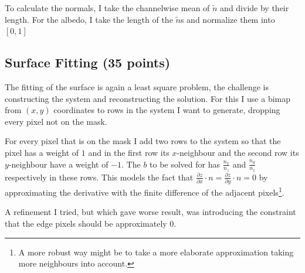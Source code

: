 \documentclass{paper}
\begin{document}
To calculate the normals, I take the channelwise mean of $\tilde{n}$ and divide by their length. For the albedo, I take the length of the $\tilde{n}$s and normalize them into $[0,1]$

\subsection{Surface Fitting (35 points)}

The fitting of the surface is again a least square problem, the challenge is constructing the system and reconstructing the solution. For this I use a bimap from $(x,y)$ coordinates to rows in the system I want to generate, dropping every pixel not on the mask.

For every pixel that is on the mask I add two rows to the system so that the pixel has a weight of $1$ and in the first row its $x$-neighbour and the second row its $y$-neighbour have a weight of $-1$. The $b$ to be solved for has $\frac{n_x}{n_z}$ and $\frac{n_y}{n_z}$ respectively in these rows. This models the fact that $\frac{\partial z}{\partial x}\cdot n =\frac{\partial z}{\partial y}\cdot n = 0$ by approximating the derivative with the finite difference of the adjacent pixels\footnote{A more robust way might be to take a more elaborate approximation taking more neighbours into account.}.

A refinement I tried, but which gave worse result, was introducing the constraint that the edge pixels should be approximately 0.
\end{document}
